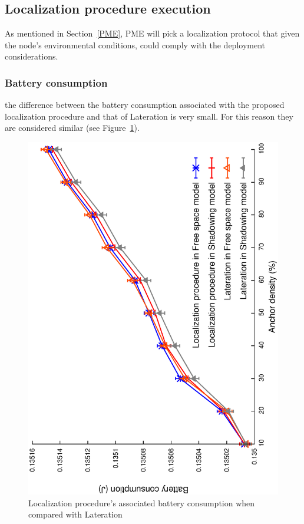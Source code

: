 
\subsection{Localization procedure execution}\label{locProc_executions}
As mentioned in Section~\ref{PME}, PME will pick a localization protocol that given the node's environmental conditions, could comply with the deployment considerations.

\subsubsection{Battery consumption}
the difference between the battery consumption associated with the proposed localization procedure and that of Lateration is very small. For this reason they are considered similar (see Figure~\ref{pme:battery}).

\begin{figure}[tb]
  \centering
  \includegraphics[width=0.7\linewidth, angle = -90]{section4/figures/pmeBat.eps}
  \caption{Localization procedure's associated battery consumption when compared with Lateration
  \label{pme:battery}}
\end{figure}

